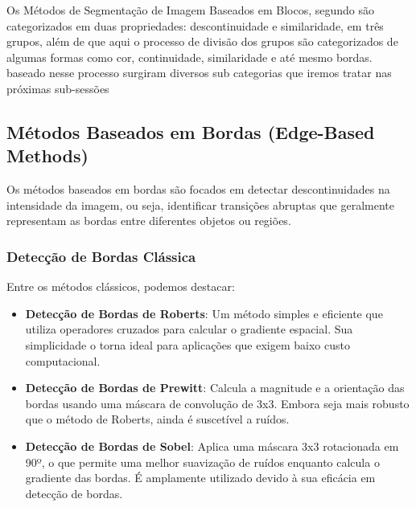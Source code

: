 Os Métodos de Segmentação de Imagem Baseados em Blocos, segundo   são categorizados em duas propriedades: descontinuidade e similaridade, em três grupos, além de que aqui o processo de divisão dos grupos são categorizados de algumas formas
como cor, continuidade, similaridade e até mesmo bordas. baseado nesse processo surgiram diversos sub categorias que iremos tratar nas próximas sub-sessões 

\subsection{Métodos Baseados em Bordas (Edge-Based Methods)}
Os métodos baseados em bordas são focados em detectar descontinuidades na intensidade da imagem, ou seja, identificar transições abruptas que geralmente representam as bordas entre diferentes objetos ou regiões.

\subsubsection{Detecção de Bordas Clássica}
Entre os métodos clássicos, podemos destacar:
\begin{itemize}
    \item \textbf{Detecção de Bordas de Roberts}: Um método simples e eficiente que utiliza operadores cruzados para calcular o gradiente espacial. Sua simplicidade o torna ideal para aplicações que exigem baixo custo computacional.
    \item \textbf{Detecção de Bordas de Prewitt}: Calcula a magnitude e a orientação das bordas usando uma máscara de convolução de 3x3. Embora seja mais robusto que o método de Roberts, ainda é suscetível a ruídos.
    \item \textbf{Detecção de Bordas de Sobel}: Aplica uma máscara 3x3 rotacionada em 90º, o que permite uma melhor suavização de ruídos enquanto calcula o gradiente das bordas. É amplamente utilizado devido à sua eficácia em detecção de bordas.
\end{itemize}

